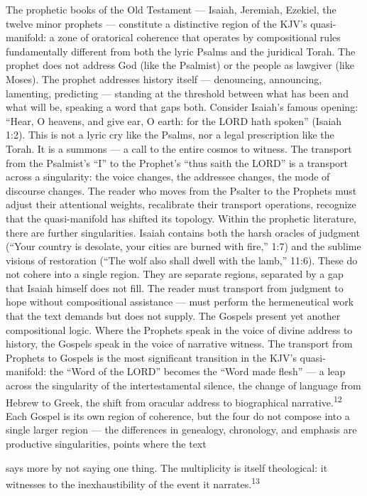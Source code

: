 The prophetic books of the Old Testament — Isaiah, Jeremiah, Ezekiel, the twelve minor prophets — constitute a distinctive region of the KJV’s quasi-manifold: a zone of oratorical coherence that operates by compositional rules fundamentally different from both the lyric Psalms and the juridical Torah. The prophet does not address God (like the Psalmist) or the people as lawgiver (like Moses). The prophet addresses history itself — denouncing, announcing, lamenting, predicting — standing at the threshold between what has been and what will be, speaking a word that gaps both. Consider Isaiah’s famous opening: “Hear, O heavens, and give ear, O earth: for the LORD hath spoken” (Isaiah 1:2). This is not a lyric cry like the Psalms, nor a legal prescription like the Torah. It is a summons — a call to the entire cosmos to witness. The transport from the Psalmist’s “I” to the Prophet’s “thus saith the LORD” is a transport across a singularity: the voice changes, the addressee changes, the mode of discourse changes. The reader who moves from the Psalter to the Prophets must adjust their attentional weights, recalibrate their transport operations, recognize that the quasi-manifold has shifted its topology. Within the prophetic literature, there are further singularities. Isaiah contains both the harsh oracles of judgment (“Your country is desolate, your cities are burned with fire,” 1:7) and the sublime visions of restoration (“The wolf also shall dwell with the lamb,” 11:6). These do not cohere into a single region. They are separate regions, separated by a gap that Isaiah himself does not fill. The reader must transport from judgment to hope without compositional assistance — must perform the hermeneutical work that the text demands but does not supply. The Gospels present yet another compositional logic. Where the Prophets speak in the voice of divine address to history, the Gospels speak in the voice of narrative witness. The transport from Prophets to Gospels is the most significant transition in the KJV’s quasi-manifold: the “Word of the LORD” becomes the “Word made flesh” — a leap across the singularity of the intertestamental silence, the change of language from Hebrew to Greek, the shift from oracular address to biographical narrative.\textsuperscript{12} Each Gospel is its own region of coherence, but the four do not compose into a single larger region — the differences in genealogy, chronology, and emphasis are productive singularities, points where the text

says more by not saying one thing. The multiplicity is itself theological: it witnesses to the inexhaustibility of the event it narrates.\textsuperscript{13}

